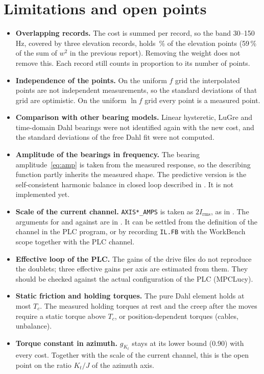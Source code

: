 \documentclass[10pt,a4paper]{article}
\numberwithin{equation}{section}
\begin{document}
\section{Limitations and open points}\label{sec:limits}
\begin{itemize}
\item \textbf{Overlapping records.} The cost is summed per record, so the band 30--150\,Hz, covered by three elevation records, holds \overlapShare\,\% of the elevation points (59\,\% of the sum of $w^2$ in the previous report). Removing the weight does not remove this. Each record still counts in proportion to its number of points.
\item \textbf{Independence of the points.} On the uniform $f$ grid the interpolated points are not independent measurements, so the standard deviations of that grid are optimistic. On the uniform $\ln f$ grid every point is a measured point.
\item \textbf{Comparison with other bearing models.} Linear hysteretic, LuGre and time-domain Dahl bearings were not identified again with the new cost, and the standard deviations of the free Dahl fit were not computed.
\item \textbf{Amplitude of the bearings in frequency.} The bearing amplitude~\eqref{eq:amp} is taken from the measured response, so the describing function partly inherits the measured shape. The predictive version is the self-consistent harmonic balance in closed loop described in . It is not implemented yet.
\item \textbf{Scale of the current channel.} \texttt{AXIS*\_AMPS} is taken as $2I_\mathrm{rms}$, as in . The arguments for and against are in . It can be settled from the definition of the channel in the PLC program, or by recording \texttt{IL.FB} with the WorkBench scope together with the PLC channel.
\item \textbf{Effective loop of the PLC.} The gains of the drive files do not reproduce the doublets; three effective gains per axis are estimated from them. They should be checked against the actual configuration of the PLC (MPCLucy).
\item \textbf{Static friction and holding torques.} The pure Dahl element holds at most $T_c$. The measured holding torques at rest and the creep after the moves require a static torque above $T_c$, or position-dependent torques (cables, unbalance).
\item \textbf{Torque constant in azimuth.} $g_{K_t}$ stays at its lower bound (0.90) with every cost. Together with the scale of the current channel, this is the open point on the ratio $K_t/J$ of the azimuth axis.
\end{itemize}
\end{document}
